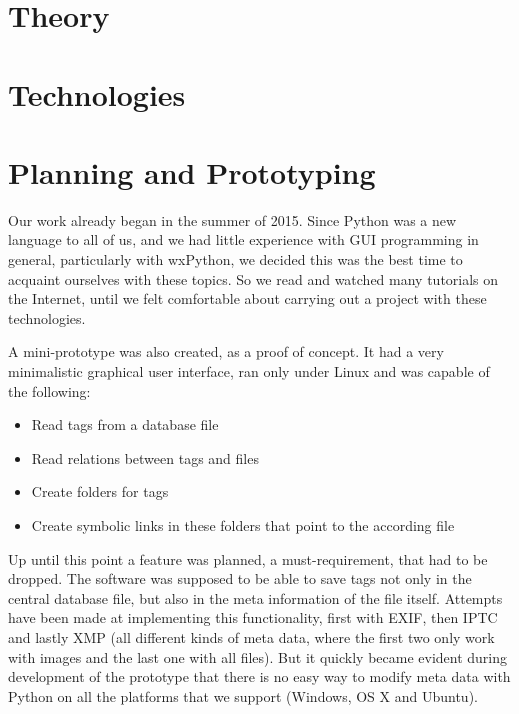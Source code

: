 \section{Theory}
\def \kapitelautor {Christoph Führer}

\section{Technologies}
\def \kapitelautor {Christoph Führer}

\section{Planning and Prototyping} %
\def \kapitelautor {Erik Ritschl}

Our work already began in the summer of 2015. Since Python was a new language to all of us, and we had little experience with GUI programming in general, particularly with wxPython, we decided this was the best time to acquaint ourselves with these topics. So we read and watched many tutorials on the Internet, until we felt comfortable about carrying out a project with these technologies.

A mini-prototype was also created, as a proof of concept. It had a very minimalistic graphical user interface, ran only under Linux and was capable of the following:

\begin{itemize}
	\item Read tags from a database file
	\item Read relations between tags and files
	\item Create folders for tags
	\item Create symbolic links in these folders that point to the according file
\end{itemize}

Up until this point a feature was planned, a must-requirement, that had to be dropped. The software was supposed to be able to save tags not only in the central database file, but also in the meta information of the file itself. Attempts have been made at implementing this functionality, first with EXIF, then IPTC and lastly XMP (all different kinds of meta data, where the first two only work with images and the last one with all files). But it quickly became evident during development of the prototype that there is no easy way to modify meta data with Python on all the platforms that we support (Windows, OS X and Ubuntu).

